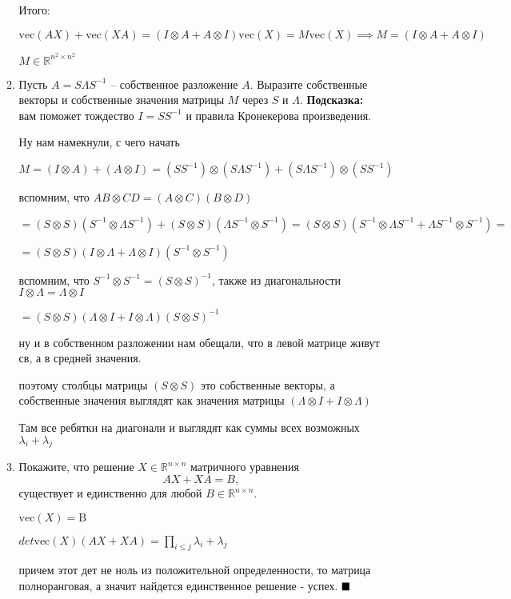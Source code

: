 \documentclass[a4paper, 11pt]{article}
\newcommand{\RR}{\mathbb{R}}
\begin{document}
\begin{enumerate}
\begin{enumerate}
			
			Итого:
			
				$\mathrm{vec}(AX) + \mathrm{vec}(XA) = (I \otimes A + A \otimes I)\mathrm{vec}(X) = M\mathrm{vec}(X) \implies M = (I \otimes A + A \otimes I)$		
				
				$M \in \RR^{n^2 \times n^2}$
		
		\item Пусть $A = S\Lambda S^{-1}$ -- собственное разложение $A$. Выразите собственные векторы и собственные значения матрицы $M$ через $S$ и $\Lambda$. \textbf{Подсказка:} вам поможет тождество $I = SS^{-1}$ и правила Кронекерова произведения.
		
			Ну нам намекнули, с чего начать
			
			$M = (I \otimes A) + (A \otimes I) = (SS^{-1}) \otimes (S\Lambda S^{-1}) + (S \Lambda S^{-1}) \otimes (SS^{-1})$
			
			вспомним, что $AB \otimes CD = (A \otimes C) (B \otimes D)$
			
			$= (S \otimes S) (S^{-1} \otimes \Lambda S^{-1}) + (S \otimes S) (\Lambda S^{-1} \otimes S^{-1}) = (S \otimes S) (S^{-1} \otimes \Lambda S^{-1} + \Lambda S^{-1} \otimes S^{-1}) =$
			
			$= (S \otimes S) (I \otimes \Lambda + \Lambda\otimes  I) (S^{-1} \otimes S^{-1})$
			
			вспомним, что $S^{-1} \otimes S^{-1} = (S \otimes S)^{-1}$, также из диагональности $I \otimes \Lambda = \Lambda \otimes I $
			
			$= (S \otimes S)(\Lambda \otimes I + I \otimes \Lambda) (S \otimes S)^{-1}$
			
			ну и в собственном разложении нам обещали, что в левой матрице живут св, а в средней значения.
			
			поэтому столбцы матрицы $(S \otimes S)$ это собственные векторы, а собственные значения выглядят как значения матрицы $(\Lambda \otimes I + I \otimes \Lambda)$
			
			Там все ребятки на диагонали и выглядят как суммы всех возможных $\lambda_i + \lambda_j$ 
			
			
					
		\item Покажите, что решение $X\in\mathbb{R}^{n\times n}$ матричного уравнения
		\[
		AX + XA = B,
		\]
		существует и единственно для любой $B\in\mathbb{R}^{n\times n}$.
		
			$\mathrm{vec}(X) = \mathrm{B}$
			
			$\displaystyle det \mathrm{vec}(X)(AX + XA) = \prod_{i \leq j} \lambda_i + \lambda_j$
			
			причем этот дет не ноль из положительной определенности, то матрица полноранговая, а значит найдется единственное решение - успех. $\hfill \blacksquare$
			
			
		
	\end{enumerate}
\end{enumerate}
\end{document}
